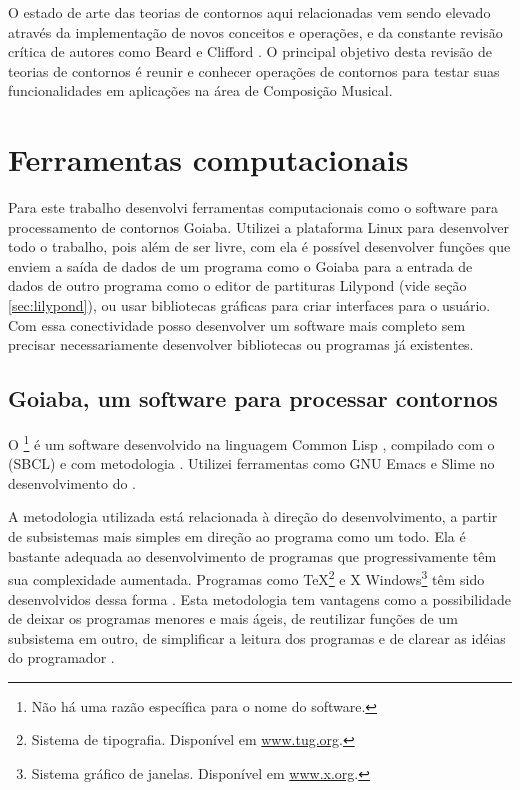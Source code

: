 O estado de arte das teorias de contornos aqui relacionadas vem sendo
elevado através da implementação de novos conceitos e operações, e da
constante revisão crítica de autores como Beard e Clifford
\cite{beard03:contour,clifford95:contour}. O principal objetivo desta
revisão de teorias de contornos é reunir e conhecer operações de
contornos para testar suas funcionalidades em aplicações na área de
Composição Musical.

\chapter{Ferramentas computacionais}
\label{cha:ferramentas}

Para este trabalho desenvolvi ferramentas computacionais como o
software para processamento de contornos Goiaba. Utilizei a plataforma
Linux para desenvolver todo o trabalho, pois além de ser livre, com
ela é possível desenvolver funções que enviem a saída de dados de um
programa como o Goiaba para a entrada de dados de outro programa como
o editor de partituras Lilypond (vide seção \ref{sec:lilypond}), ou
usar bibliotecas gráficas para criar interfaces para o usuário. Com
essa conectividade posso desenvolver um software mais completo sem
precisar necessariamente desenvolver bibliotecas ou programas já
existentes.

\section{Goiaba, um software para processar contornos}
\label{sec:goiaba-software-para}

O \goiaba{}\footnote{Não há uma razão específica para o nome do
  software.}  é um software desenvolvido na linguagem Common Lisp
\cite{graham94:lisp,seibel05:practical,shapiro92:common}, compilado
com o  (SBCL) \cite{team07:sbcl} e com
metodologia . Utilizei ferramentas como GNU Emacs
\cite{stallman07:gnu} e Slime \cite{team05:slime} no desenvolvimento
do \goiaba{}.

A metodologia  utilizada está relacionada à direção do
desenvolvimento, a partir de subsistemas mais simples em direção ao
programa como um todo. Ela é bastante adequada ao desenvolvimento de
programas que progressivamente têm sua complexidade
aumentada. Programas como \TeX{}\footnote{Sistema de
  tipografia. Disponível em \url{www.tug.org}.} e X
Windows\footnote{Sistema gráfico de janelas. Disponível em
  \url{www.x.org}.} têm sido desenvolvidos dessa forma
\cite[p. vi]{graham94:lisp}. Esta metodologia tem vantagens como a
possibilidade de deixar os programas menores e mais ágeis, de
reutilizar funções de um subsistema em outro, de simplificar a leitura
dos programas e de clarear as idéias do programador
\cite[p. 4]{graham94:lisp}.

